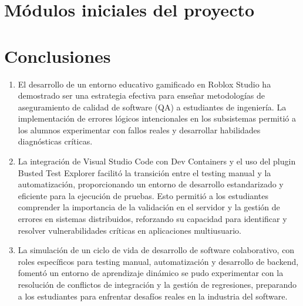\section{Módulos iniciales del proyecto}
\label{workflow}


\section{Conclusiones}
\label{conclusiones}

\begin{enumerate}
    \item El desarrollo de un entorno educativo gamificado en Roblox Studio ha demostrado ser una estrategia efectiva para enseñar metodologías de aseguramiento de calidad de software (QA) a estudiantes de ingeniería. La implementación de errores lógicos intencionales en los subsistemas permitió a los alumnos experimentar con fallos reales y desarrollar habilidades diagnósticas críticas.
    \item La integración de Visual Studio Code con Dev Containers y el uso del plugin Busted Test Explorer facilitó la transición entre el testing manual y la automatización, proporcionando un entorno de desarrollo estandarizado y eficiente para la ejecución de pruebas. Esto permitió a los estudiantes comprender la importancia de la validación en el servidor y la gestión de errores en sistemas distribuidos, reforzando su capacidad para identificar y resolver vulnerabilidades críticas en aplicaciones multiusuario.
    \item La simulación de un ciclo de vida de desarrollo de software colaborativo, con roles específicos para testing manual, automatización y desarrollo de backend, fomentó un entorno de aprendizaje dinámico se pudo experimentar con la resolución de conflictos de integración y la gestión de regresiones, preparando a los estudiantes para enfrentar desafíos reales en la industria del software.
\end{enumerate}